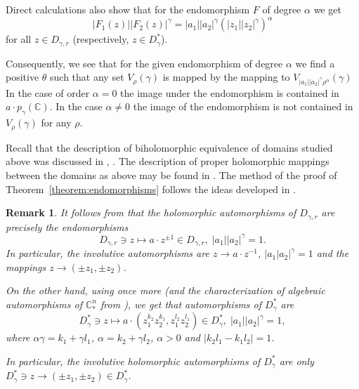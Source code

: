 \documentclass[a4paper,12pt]{amsart}
\newtheorem{remark}[theorem]{Remark}
\theoremstyle{definition}
\begin{document}
   Direct calculations also show that for the endomorphism $F$ of degree $\alpha$ we get 
    \begin{equation}
        |F_1(z)||F_2(z)|^{\gamma}=|a_1||a_2|^{\gamma}(|z_1||z_2|^{\gamma})^{\alpha}
    \end{equation}
    for all $z\in D_{\gamma,r}$ (respectively, $z\in D_{\gamma}^*$).

Consequently, we see that for the given endomorphism of degree $\alpha$ we find a positive $\theta$ such that any set $V_{\rho}(\gamma)$ is mapped by the mapping to $V_{|a_1||a_2|^{\gamma} \rho^{\alpha}}(\gamma)$ %
In the case of order $\alpha=0$ the image under the endomorphism is contained in $a\cdot p_{\gamma}(\mathbb C)$.
In the case $\alpha\neq 0$ the image of the endomorphism is not contained in $V_{\rho}(\gamma)$ for any $\rho$.

Recall that the description of biholomorphic equivalence of domains studied above was discussed in \cite{MR1144475}, \cite{MR1189968}. The description of proper holomorphic mappings between the domains as above may be found in \cite{05208635}. The method of the proof of Theorem~\ref{theorem:endomorphisms} follows the ideas developed in \cite{05208635}.

\begin{remark} It follows from \cite{05208635} that the holomorphic automorphisms of $D_{\gamma,r}$ are precisely the endomorphisms
  \begin{equation}
      D_{\gamma,r}\owns z \mapsto a\cdot z^{\pm 1}\in D_{\gamma,r},\;|a_1||a_2|^{\gamma}=1.
  \end{equation}
  In particular, the involutive automorphisms are $z\to a\cdot z^{-1}$, $|a_1|a_2|^{\gamma}=1$ and the mappings $z\to (\pm z_1,\pm z_2)$.

  On the other hand, using \cite{05208635} once more (and the characterization of algebraic automorphisms of $\mathbb C_*^n$ from \cite{MR1678013}), we get that automorphisms of $D_{\gamma}^*$ are
  \begin{equation}
      D_{\gamma}^*\owns z \mapsto a\cdot (z_1^{k_2}z_2^{k_1},z_1^{l_2}z_2^{l_1})\in D_{\gamma}^*,\; |a_1||a_2|^{\gamma}=1,
  \end{equation}
  where $\alpha\gamma=k_1+\gamma l_1$, $\alpha=k_2+\gamma l_2$, $\alpha>0$ and $|k_2l_1-k_1l_2|=1$.

In particular, the involutive holomorphic automorphisms of $D_{\gamma}^*$ are only $D_{\gamma}^*\owns z\to (\pm z_1,\pm z_2)\in D_{\gamma}^*$.
\end{remark}
\end{document}
